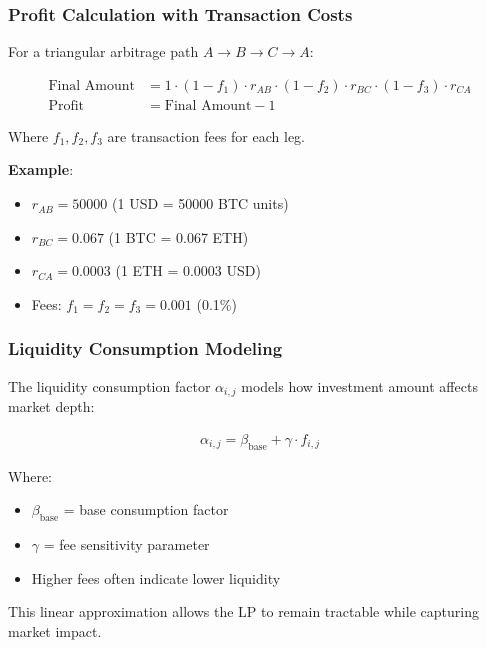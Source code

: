 \documentclass{beamer}
\begin{document}
\begin{frame}
\frametitle{Profit Calculation with Transaction Costs}
For a triangular arbitrage path $A \rightarrow B \rightarrow C \rightarrow A$:

\begin{align}
\text{Final Amount} &= 1 \cdot (1-f_1) \cdot r_{AB} \cdot (1-f_2) \cdot r_{BC} \cdot (1-f_3) \cdot r_{CA} \\
\text{Profit} &= \text{Final Amount} - 1
\end{align}

Where $f_1, f_2, f_3$ are transaction fees for each leg.

\vspace{0.5cm}

\textbf{Example}:
\begin{itemize}
    \item $r_{AB} = 50000$ (1 USD = 50000 BTC units)
    \item $r_{BC} = 0.067$ (1 BTC = 0.067 ETH)
    \item $r_{CA} = 0.0003$ (1 ETH = 0.0003 USD)
    \item Fees: $f_1 = f_2 = f_3 = 0.001$ (0.1\%)
\end{itemize}
\end{frame}

\begin{frame}
\frametitle{Liquidity Consumption Modeling}
The liquidity consumption factor $\alpha_{i,j}$ models how investment amount affects market depth:

\begin{align}
\alpha_{i,j} = \beta_{\text{base}} + \gamma \cdot f_{i,j}
\end{align}

Where:
\begin{itemize}
    \item $\beta_{\text{base}}$ = base consumption factor
    \item $\gamma$ = fee sensitivity parameter
    \item Higher fees often indicate lower liquidity
\end{itemize}

\vspace{0.5cm}

This linear approximation allows the LP to remain tractable while capturing market impact.
\end{frame}
\end{document}
